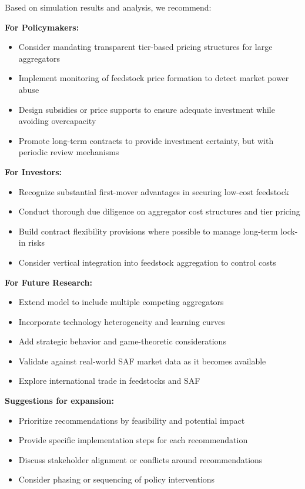\documentclass[10.5pt]{article}
\begin{document}
Based on simulation results and analysis, we recommend:

\textbf{For Policymakers:}
\begin{itemize}
    \item Consider mandating transparent tier-based pricing structures for large aggregators
    \item Implement monitoring of feedstock price formation to detect market power abuse
    \item Design subsidies or price supports to ensure adequate investment while avoiding overcapacity
    \item Promote long-term contracts to provide investment certainty, but with periodic review mechanisms
\end{itemize}

\textbf{For Investors:}
\begin{itemize}
    \item Recognize substantial first-mover advantages in securing low-cost feedstock
    \item Conduct thorough due diligence on aggregator cost structures and tier pricing
    \item Build contract flexibility provisions where possible to manage long-term lock-in risks
    \item Consider vertical integration into feedstock aggregation to control costs
\end{itemize}

\textbf{For Future Research:}
\begin{itemize}
    \item Extend model to include multiple competing aggregators
    \item Incorporate technology heterogeneity and learning curves
    \item Add strategic behavior and game-theoretic considerations
    \item Validate against real-world SAF market data as it becomes available
    \item Explore international trade in feedstocks and SAF
\end{itemize}

\textbf{Suggestions for expansion:}
\begin{itemize}
    \item Prioritize recommendations by feasibility and potential impact
    \item Provide specific implementation steps for each recommendation
    \item Discuss stakeholder alignment or conflicts around recommendations
    \item Consider phasing or sequencing of policy interventions
\end{itemize}
\end{document}
